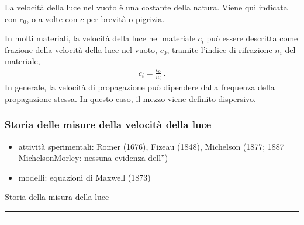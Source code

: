 \documentclass[letterpaper,10pt,italian]{jupyterBook}
\begin{document}
\sphinxAtStartPar
{} La velocità della luce nel vuoto è una costante della natura. Viene qui indicata con \(c_0\), o a volte con \(c\) per brevità o pigrizia.

\sphinxAtStartPar
{} In molti materiali, la velocità della luce nel materiale \(c_i\) può essere descritta come frazione della velocità della luce nel vuoto, \(c_0\), tramite l’indice di rifrazione \(n_i\) del materiale,
\begin{equation*}
\begin{split}c_i = \frac{c_0}{n_i} \ .\end{split}
\end{equation*}
\sphinxAtStartPar
In generale, la velocità di propagazione può dipendere dalla frequenza della propagazione stessa. In questo caso, il mezzo viene definito dispersivo.  


\subsubsection*{Storia delle misure della velocità della luce}
\begin{itemize}
\item {} 
\sphinxAtStartPar
attività sperimentali: Romer (1676), Fizeau (1848), Michelson (1877; 1887 Michelson\sphinxhyphen{}Morley: nessuna evidenza dell”)

\item {} 
\sphinxAtStartPar
modelli: equazioni di Maxwell (1873)

\end{itemize}

\sphinxAtStartPar
Storia della misura della luce%
\begin{footnote}[1]\sphinxAtStartFootnote
{}
%
\end{footnote}


\bigskip\hrule\bigskip


\sphinxAtStartPar
{}


\bigskip\hrule\bigskip


\sphinxstepscope
\end{document}
